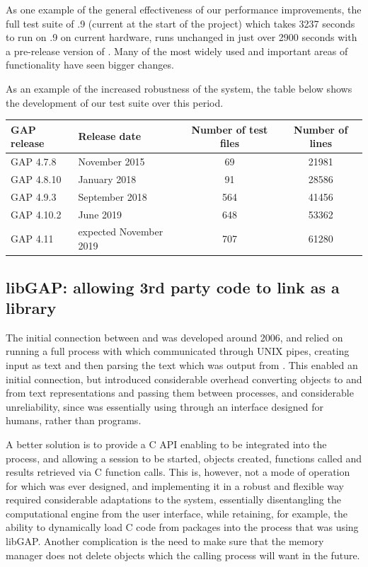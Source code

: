 \documentclass{deliverablereport}
\begin{document}
As one example of the general effectiveness of our performance
improvements, the full test suite of .9 (current at the
start of the project) which takes 3237 seconds to run on .9 on
current hardware, runs unchanged in just over 2900 seconds with a
pre-release version of . Many of the most widely used and
important areas of \GAP functionality have seen bigger changes.  


As an example of the increased robustness of the system, the table
below shows the development of our test suite over this period.

\begin{center}
\begin{tabular}{| l | l | c | c |} 
\hline
GAP release & Release date & Number of test files & Number of lines \\
\hline GAP 4.7.8  & November 2015           & 69 & 21981 \\
\hline GAP 4.8.10 & January 2018            & 91 & 28586 \\
\hline GAP 4.9.3  & September 2018          & 564 & 41456 \\
\hline GAP 4.10.2 & June 2019               & 648 & 53362 \\
\hline GAP 4.11   & expected November 2019  & 707 & 61280 \\
\hline
\end{tabular}
\end{center}

\subsection{libGAP: allowing 3rd party code to link \GAP as a library}\label{libgap}

The initial connection between \Sage and \GAP was developed around
2006, and relied on running a full \GAP process with which \Sage
communicated through UNIX pipes, creating \GAP input as text and then parsing
the text which was output from \GAP. This enabled an initial connection, but
introduced considerable overhead converting objects to and from text
representations and passing them between processes, and considerable
unreliability, since \Sage was essentially using \GAP through an
interface designed for humans, rather than programs.

A better solution is to provide a C API enabling \GAP to be integrated
into the \Sage process, and allowing a \GAP session to be started,
objects created, functions called and results retrieved via C function
calls. This is, however, not a mode of operation for which \GAP was
ever designed, and implementing it in a robust and flexible way
required considerable adaptations to the system, essentially
disentangling the computational engine from the user interface, while retaining,
for example, the ability to dynamically load C code from \GAP
packages into the process that was using libGAP. Another complication
is the need to make sure that the \GAP memory manager does not delete
objects which the calling process will want in the future.
\end{document}
